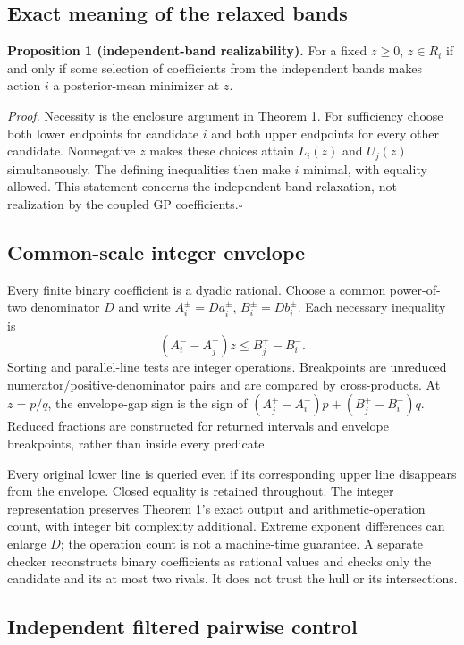 \documentclass[]{interact}
\begin{document}
\subsection{Exact meaning of the relaxed bands}

\textbf{Proposition 1 (independent-band realizability).} For a fixed $z\geq0$, $z\in R_i$ if and only if some selection of coefficients from the independent bands makes action $i$ a posterior-mean minimizer at $z$.

\textit{Proof.} Necessity is the enclosure argument in Theorem 1. For sufficiency choose both lower endpoints for candidate $i$ and both upper endpoints for every other candidate. Nonnegative $z$ makes these choices attain $L_i(z)$ and $U_j(z)$ simultaneously. The defining inequalities then make $i$ minimal, with equality allowed. This statement concerns the independent-band relaxation, not realization by the coupled GP coefficients.\hfill$\square$

\subsection{Common-scale integer envelope}

Every finite binary coefficient is a dyadic rational. Choose a common power-of-two denominator $D$ and write $A_i^\pm=Da_i^\pm$, $B_i^\pm=Db_i^\pm$. Each necessary inequality is
\begin{equation}
 (A_i^- - A_j^+)z\leq B_j^+-B_i^- .\label{eq:integer_band}
\end{equation}
Sorting and parallel-line tests are integer operations. Breakpoints are unreduced numerator/positive-denominator pairs and are compared by cross-products. At $z=p/q$, the envelope-gap sign is the sign of $(A_j^+-A_i^-)p+(B_j^+-B_i^-)q$. Reduced fractions are constructed for returned intervals and envelope breakpoints, rather than inside every predicate.

Every original lower line is queried even if its corresponding upper line disappears from the envelope. Closed equality is retained throughout. The integer representation preserves Theorem 1's exact output and arithmetic-operation count, with integer bit complexity additional. Extreme exponent differences can enlarge $D$; the operation count is not a machine-time guarantee. A separate checker reconstructs binary coefficients as rational values and checks only the candidate and its at most two rivals. It does not trust the hull or its intersections.

\subsection{Independent filtered pairwise control}
\end{document}
